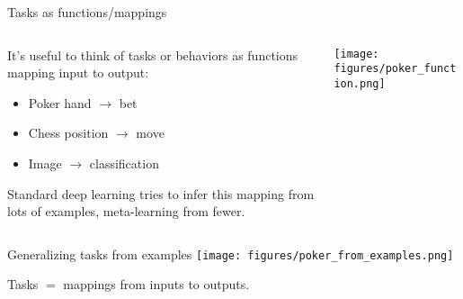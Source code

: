 \documentclass{beamer}
\begin{document}
\begin{frame}{Tasks as functions/mappings}
\begin{columns}
\begin{column}{0.5\textwidth}
It's useful to think of tasks or behaviors as functions mapping input to output:
\begin{itemize}
    \item Poker hand \(\rightarrow\) bet
    \item Chess position \(\rightarrow\) move
    \item Image \(\rightarrow\) classification
\end{itemize}
Standard deep learning tries to infer this mapping from lots of examples, meta-learning from fewer. 
\end{column}

\begin{column}{0.5\textwidth}
\texttt{[image: figures/poker\_function.png]}
\end{column}
\end{columns}
\end{frame}

\begin{frame}{Generalizing tasks from examples}
\centering
\texttt{[image: figures/poker\_from\_examples.png]}
\end{frame}

\begin{frame}[standout]
Tasks \(\bm =\) mappings from inputs to outputs.\\[1em] 
\end{frame}

%
%
\end{document}
